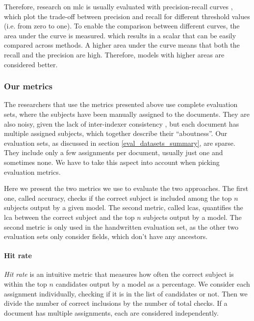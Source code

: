 Therefore, research on \acrshort{mlc} is usually evaluated with precision-recall curves \cite{wehrmann2018hierarchical}, which plot the trade-off between precision and recall for different threshold values (i.e. from zero to one). To enable the comparison between different curves, the area under the curve is measured. which results in a scalar that can be easily compared across methods. A higher area under the curve means that both the recall and the precision are high. Therefore, models with higher areas are considered better.

\subsubsection{Our metrics} \label{eval_metrics_our}

The researchers that use the metrics presented above use complete evaluation sets, where the subjects have been manually assigned to the documents. They are also noisy, given the lack of inter-indexer consistency \cite{csomai2007investigations}, but each document has multiple assigned subjects, which together describe their ``aboutness''. Our evaluation sets, as discussed in section \ref{eval_datasets_summary}, are sparse. They include only a few assignments per document, usually just one and sometimes none. We have to take this aspect into account when picking evaluation metrics.

Here we present the two metrics we use to evaluate the two approaches. The first one, called accuracy, checks if the correct subject is included among the top $n$ subjects output by a given model. The second metric, called \acrfull{lcas}, quantifies the \acrfull{lca} between the correct subject and the top $n$ subjects output by a model. The second metric is only used in the handwritten evaluation set, as the other two evaluation sets only consider fields, which don't have any ancestors.

\paragraph{Hit rate} \mbox{}

\textit{Hit rate} is an intuitive metric that measures how often the correct subject is within the top $n$ candidates output by a model as a percentage. We consider each assignment individually, checking if it is in the list of candidates or not. Then we divide the number of correct inclusions by the number of total checks. If a document has multiple assignments, each are considered independently.

